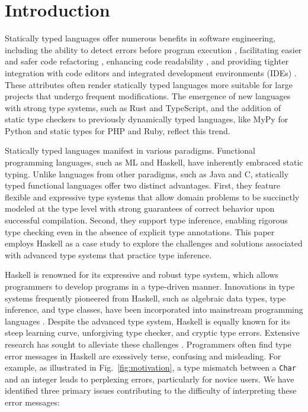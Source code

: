 \documentclass[pdflatex,sn-nature,Numbered]{sn-jnl}%
\begin{document}
\section{Introduction} \label{sec:introduction}

Statically typed languages offer numerous benefits in software engineering, including the ability to detect errors before program execution \cite{Ray2017-gq,Gao2017-xn}, facilitating easier and safer code refactoring \cite{Kleinschmager2012-bg}, enhancing code readability \cite{Endrikat2014-uz}, and providing tighter integration with code editors and integrated development environments (IDEs) \cite{Mayer2012-ko}. These attributes often render statically typed languages more suitable for large projects that undergo frequent modifications. The emergence of new languages with strong type systems, such as Rust and TypeScript, and the addition of static type checkers to previously dynamically typed languages, like MyPy for Python and static types for PHP and Ruby, reflect this trend.

Statically typed languages manifest in various paradigms. Functional programming languages, such as ML and Haskell, have inherently embraced static typing. Unlike languages from other paradigms, such as Java and C, statically typed functional languages offer two distinct advantages. First, they feature flexible and expressive type systems that allow domain problems to be succinctly modeled at the type level with strong guarantees of correct behavior upon successful compilation. Second, they support type inference, enabling rigorous type checking even in the absence of explicit type annotations. This paper employs Haskell as a case study to explore the challenges and solutions associated with advanced type systems that practice type inference.

Haskell is renowned for its expressive and robust type system, which allows programmers to develop programs in a type-driven manner. Innovations in type systems frequently pioneered from Haskell, such as algebraic data types, type inference, and type classes, have been incorporated into mainstream programming languages \cite{Hudak2007-kn, TypeScriptTeam_undated-qk, Klabnik_undated-mp, Griesemer_undated-ff}. Despite the advanced type system, Haskell is equally known for its steep learning curve, unforgiving type checker, and cryptic type errors. Extensive research has sought to alleviate these challenges \cite{Tirronen2015-nr, Chen2014-dz, Heeren2003-kd, Zhang2015-xy, Lerner2007-mu, Zhang2017-tj}. Programmers often find type error messages in Haskell are exessively terse, confusing and misleading. For example, as illustrated in Fig.~\ref{fig:motivation}, a type mismatch between a {\tt Char} and an integer leads to perplexing errors, particularly for novice users. We have identified three primary issues contributing to the difficulty of interpreting these error messages:
\end{document}
